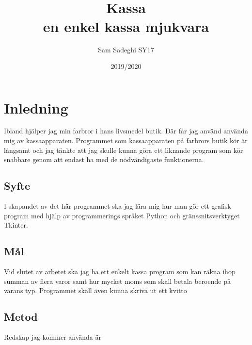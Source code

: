 \documentclass[a4paper, 12pt]{article}
\title{Kassa\\\large en enkel kassa mjukvara}
\author{Sam Sadeghi SY17}
\date{2019/2020}
\begin{document}
\begin{titlepage}
\maketitle
\end{titlepage}


\begin{abstract}

\end{abstract}
\newpage
\tableofcontents
\newpage

\section{Inledning}
Ibland hjälper jag min farbror i hans livsmedel butik. 
Där får jag använd använda mig av kassaapparaten. 
Programmet som kassaapparaten på farbrors butik kör är långsamt och jag tänkte att jag skulle kunna göra ett liknande program som kör snabbare genom att endast ha med de nödvändigaste funktionerna.

\subsection{Syfte}

I skapandet av det här programmet ska jag lära mig hur man gör ett grafisk program med hjälp av programmerings språket Python och gränssnitsverktyget Tkinter. 

\subsection{Mål}

Vid slutet av arbetet ska jag ha ett enkelt kassa program som kan räkna ihop summan av flera varor samt hur mycket moms som skall betala beroende på varans typ. Programmet skall även kunna skriva ut ett kvitto 

\subsection{Metod}

Redskap jag kommer använda är
\end{document}
